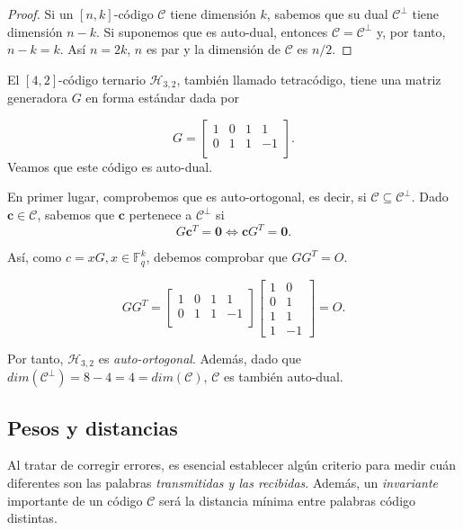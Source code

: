 \begin{proof}
Si un $[n,k]$-código $\mathcal{C}$ tiene dimensión $k$, sabemos que su dual $\mathcal{C}^{\bot}$ tiene dimensión $n-k$. Si suponemos que es auto-dual, entonces $\mathcal{C} = \mathcal{C}^{\bot}$ y, por tanto, $n - k = k$. Así $n = 2k$, $n$ es par y la dimensión de $\mathcal{C}$ es $n/2$.
\end{proof}

\begin{ejemplo}
El $[4,2]$-código ternario $\mathcal{H}_{3,2}$, también llamado tetracódigo, tiene una matriz generadora $G$ en forma estándar dada por

$$G = \left[\begin{array}{cc|cc}
1&0&1&1\\
0&1&1&-1\\
\end{array}\right]. $$
Veamos que este código es auto-dual.

En primer lugar, comprobemos que es auto-ortogonal, es decir, si $\mathcal{C} \subseteq \mathcal{C}^{\bot}$. Dado $\mathbf{c} \in \mathcal{C}$, sabemos que $\mathbf{c}$ pertenece a $\mathcal{C}^{\bot}$ si
$$ G\mathbf{c}^T = \mathbf{0} \Leftrightarrow \mathbf{c}G^T = \mathbf{0}. $$

Así, como $c = xG, x \in \mathds{F}_{q}^{k}$, debemos comprobar que $GG^T = O$.

$$ GG^T = \left[\begin{array}{cccc}
1&0&1&1\\
0&1&1&-1\\
\end{array}\right]
\left[\begin{array}{cc}
1&0\\
0&1\\
1&1\\
1&-1
\end{array}\right]   = O.
$$ 

Por tanto, $\mathcal{H}_{3,2}$ es \emph{auto-ortogonal}. Además, dado que $dim(\mathcal{C}^{\bot}) = 8 - 4 = 4 = dim(\mathcal{C})$, $\mathcal{C}$ es también auto-dual.

\end{ejemplo}

\subsection{Pesos y distancias}\label{sec:1.4}

Al tratar de corregir errores, es esencial establecer algún criterio para medir cuán diferentes son las palabras \emph{transmitidas y las recibidas}. Además, un \emph{invariante} importante de un código $\mathcal{C}$ será la distancia mínima entre palabras código distintas.

